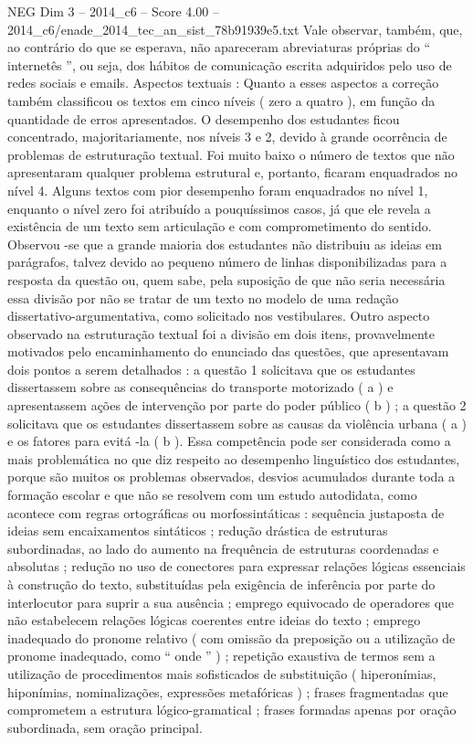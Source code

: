\begin{textsample}{NEG Dim 3 – 2014\_c6 – Score 4.00 – 2014\_c6/enade\_2014\_tec\_an\_sist\_78b91939e5.txt}
Vale observar, também, que, ao contrário do que se esperava, não apareceram abreviaturas próprias do “ internetês ”, ou seja, dos hábitos de comunicação escrita adquiridos pelo uso de redes sociais e emails.
Aspectos textuais : Quanto a esses aspectos a correção também classificou os textos em cinco níveis ( zero a quatro ), em função da quantidade de erros apresentados.
O desempenho dos estudantes ficou concentrado, majoritariamente, nos níveis 3 e 2, devido à grande ocorrência de problemas de estruturação textual.
Foi muito baixo o número de textos que não apresentaram qualquer problema estrutural e, portanto, ficaram enquadrados no nível 4.
Alguns textos com pior desempenho foram enquadrados no nível 1, enquanto o nível zero foi atribuído a pouquíssimos casos, já que ele revela a existência de um texto sem articulação e com comprometimento do sentido.
Observou -se que a grande maioria dos estudantes não distribuiu as ideias em parágrafos, talvez devido ao pequeno número de linhas disponibilizadas para a resposta da questão ou, quem sabe, pela suposição de que não seria necessária essa divisão por não se tratar de um texto no modelo de uma redação dissertativo-argumentativa, como solicitado nos vestibulares.
Outro aspecto observado na estruturação textual foi a divisão em dois itens, provavelmente motivados pelo encaminhamento do enunciado das questões, que apresentavam dois pontos a serem detalhados : a questão 1 solicitava que os estudantes dissertassem sobre as consequências do transporte motorizado ( a ) e apresentassem ações de intervenção por parte do poder público ( b ) ; a questão 2 solicitava que os estudantes dissertassem sobre as causas da violência urbana ( a ) e os fatores para evitá -la ( b ).
Essa competência pode ser considerada como a mais problemática no que diz respeito ao desempenho linguístico dos estudantes, porque são muitos os problemas observados, desvios acumulados durante toda a formação escolar e que não se resolvem com um estudo autodidata, como acontece com regras ortográficas ou morfossintáticas : sequência justaposta de ideias sem encaixamentos sintáticos ; redução drástica de estruturas subordinadas, ao lado do aumento na frequência de estruturas coordenadas e absolutas ; redução no uso de conectores para expressar relações lógicas essenciais à construção do texto, substituídas pela exigência de inferência por parte do interlocutor para suprir a sua ausência ; emprego equivocado de operadores que não estabelecem relações lógicas coerentes entre ideias do texto ; emprego inadequado do pronome relativo ( com omissão da preposição ou a utilização de pronome inadequado, como “ onde ” ) ; repetição exaustiva de termos sem a utilização de procedimentos mais sofisticados de substituição ( hiperonímias, hiponímias, nominalizações, expressões metafóricas ) ; frases fragmentadas que comprometem a estrutura lógico-gramatical ; frases formadas apenas por oração subordinada, sem oração principal.

\end{textsample}
